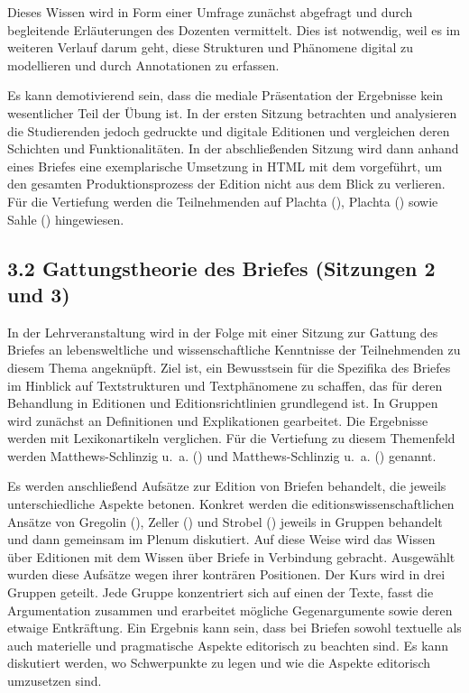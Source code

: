 \documentclass[
          a4paper,
        ]{article}
\begin{document}
Dieses Wissen wird in Form einer Umfrage zunächst abgefragt und durch
begleitende Erläuterungen des Dozenten vermittelt. Dies ist notwendig,
weil es im weiteren Verlauf darum geht, diese Strukturen und Phänomene
digital zu modellieren und durch Annotationen zu erfassen.

Es kann demotivierend sein, dass die mediale Präsentation der Ergebnisse
kein wesentlicher Teil der Übung ist. In der ersten Sitzung betrachten
und analysieren die Studierenden jedoch gedruckte und digitale Editionen
und vergleichen deren Schichten und Funktionalitäten. In der
abschließenden Sitzung wird dann anhand eines Briefes eine exemplarische
Umsetzung in HTML mit dem vorgeführt, um den gesamten Produktionsprozess
der Edition nicht aus dem Blick zu verlieren. Für die Vertiefung werden
die Teilnehmenden auf Plachta (),
Plachta () sowie Sahle
() hingewiesen.

\subsection{3.2 Gattungstheorie des Briefes (Sitzungen 2 und
3)}\label{gattungstheorie-des-briefes-sitzungen-2-und-3}

In der Lehrveranstaltung wird in der Folge mit einer Sitzung zur Gattung
des Briefes an lebensweltliche und wissenschaftliche Kenntnisse der
Teilnehmenden zu diesem Thema angeknüpft. Ziel ist, ein Bewusstsein für
die Spezifika des Briefes im Hinblick auf Textstrukturen und
Textphänomene zu schaffen, das für deren Behandlung in Editionen und
Editionsrichtlinien grundlegend ist. In Gruppen wird zunächst an
Definitionen und Explikationen gearbeitet. Die Ergebnisse werden mit
Lexikonartikeln verglichen. Für die Vertiefung zu diesem Themenfeld
werden Matthews-Schlinzig u.~a.
() und Matthews-Schlinzig
u.~a. () genannt.

Es werden anschließend Aufsätze zur Edition von Briefen behandelt, die
jeweils unterschiedliche Aspekte betonen. Konkret werden die
editionswissenschaftlichen Ansätze von Gregolin
(), Zeller
() und Strobel
() jeweils in Gruppen behandelt und
dann gemeinsam im Plenum diskutiert. Auf diese Weise wird das Wissen
über Editionen mit dem Wissen über Briefe in Verbindung gebracht.
Ausgewählt wurden diese Aufsätze wegen ihrer konträren Positionen. Der
Kurs wird in drei Gruppen geteilt. Jede Gruppe konzentriert sich auf
einen der Texte, fasst die Argumentation zusammen und erarbeitet
mögliche Gegenargumente sowie deren etwaige Entkräftung. Ein Ergebnis
kann sein, dass bei Briefen sowohl textuelle als auch materielle und
pragmatische Aspekte editorisch zu beachten sind. Es kann diskutiert
werden, wo Schwerpunkte zu legen und wie die Aspekte editorisch
umzusetzen sind.
\end{document}
